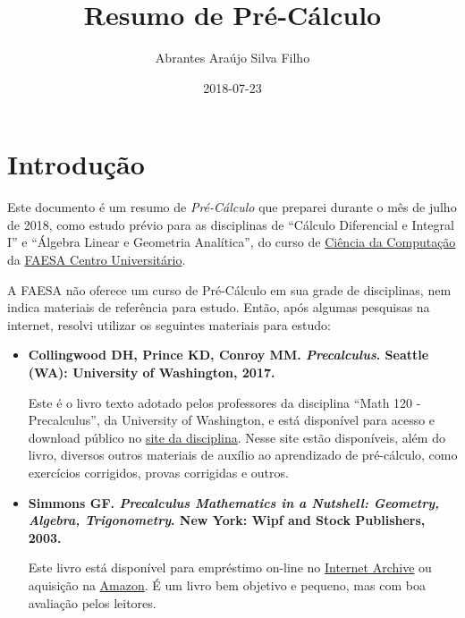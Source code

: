 \documentclass[pdftex, brazil, 12pt, twoside]{article}
\begin{document}
\title{Resumo de Pré-Cálculo}
\author{Abrantes Araújo Silva Filho}
\date{2018-07-23}
\maketitle
\tableofcontents
\newpage

\section{Introdução}
\label{intro}

Este documento é um resumo de \emph{Pré-Cálculo} que preparei durante o mês de julho
de 2018, como estudo prévio para as disciplinas de ``Cálculo Diferencial e Integral I''
e ``Álgebra Linear e Geometria Analítica'', do curso de
\href{https://www.faesa.br/curso/ciencia-da-computacao/}{Ciência da Computação}
da \href{https://www.faesa.br/}{FAESA Centro Universitário}.

A FAESA não oferece um curso de Pré-Cálculo em sua grade de disciplinas, nem indica
materiais de referência para estudo. Então, após algumas pesquisas na internet,
resolvi utilizar os seguintes materiais para estudo:

\begin{itemize}
\item \textbf{Collingwood DH, Prince KD, Conroy MM. \emph{Precalculus}. Seattle (WA): University
  of Washington, 2017.}

  Este é o livro texto adotado pelos professores da disciplina
  ``Math 120 - Precalculus'', da University of Washington, e está disponível para
  acesso e download público no \href{https://sites.math.washington.edu/~m120/}{site da disciplina}.
  Nesse site estão disponíveis, além do livro, diversos outros materiais de auxílio ao aprendizado
  de pré-cálculo, como exercícios corrigidos, provas corrigidas e outros.
  
\item \textbf{Simmons GF. \emph{Precalculus Mathematics in a Nutshell: Geometry, Algebra, Trigonometry}. New
  York: Wipf and Stock Publishers, 2003.}

  Este livro está disponível para empréstimo on-line
  no \href{https://archive.org/details/precalculusmathe00geor}{Internet Archive} ou
  aquisição na \href{https://www.amazon.com/Precalculus-Mathematics-Nutshell-Geometry-Trigonometry/dp/1592441300/}{Amazon}.
  É um livro bem objetivo e pequeno, mas com boa avaliação pelos leitores.
\end{itemize}
\end{document}
